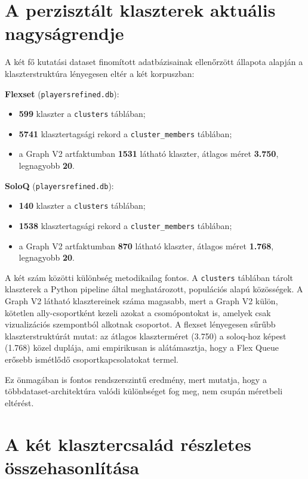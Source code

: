 \section{A perzisztált klaszterek aktuális nagyságrendje}

A két fő kutatási dataset finomított adatbázisainak ellenőrzött állapota alapján a klaszterstruktúra lényegesen eltér a két korpuszban:

\textbf{Flexset} (\texttt{playersrefined.db}):
\begin{itemize}
    \item \textbf{599} klaszter a \texttt{clusters} táblában;
    \item \textbf{5741} klasztertagsági rekord a \texttt{cluster\_members} táblában;
    \item a Graph V2 artfaktumban \textbf{1531} látható klaszter, átlagos méret \textbf{3.750}, legnagyobb \textbf{20}.
\end{itemize}

\textbf{SoloQ} (\texttt{playersrefined.db}):
\begin{itemize}
    \item \textbf{140} klaszter a \texttt{clusters} táblában;
    \item \textbf{1538} klasztertagsági rekord a \texttt{cluster\_members} táblában;
    \item a Graph V2 artfaktumban \textbf{870} látható klaszter, átlagos méret \textbf{1.768}, legnagyobb \textbf{20}.
\end{itemize}

A két szám közötti különbség metodikailag fontos. A \texttt{clusters} táblában tárolt klaszterek a Python pipeline által meghatározott, populációs alapú közösségek. A Graph V2 látható klasztereinek száma magasabb, mert a Graph V2 külön, kötetlen ally-csoportként kezeli azokat a csomópontokat is, amelyek csak vizualizációs szempontból alkotnak csoportot. A flexset lényegesen sűrűbb klaszterstruktúrát mutat: az átlagos klaszterméret (3.750) a soloq-hoz képest (1.768) közel duplája, ami empirikusan is alátámasztja, hogy a Flex Queue erősebb ismétlődő csoportkapcsolatokat termel.

Ez önmagában is fontos rendszerszintű eredmény, mert mutatja, hogy a többdataset-architektúra valódi különbséget fog meg, nem csupán méretbeli eltérést.

\section{A két klasztercsalád részletes összehasonlítása}

